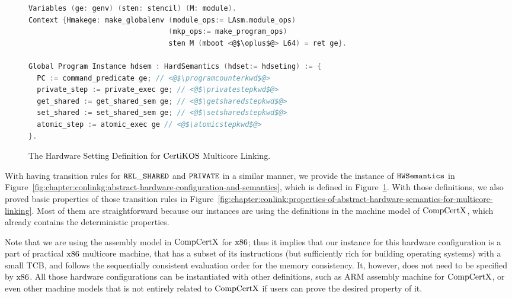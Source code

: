 \begin{figure}
\begin{lstlisting}[language=C]
Variables (ge: genv) (sten: stencil) (M: module).
Context {Hmakege: make_globalenv (module_ops:= LAsm.module_ops) 
                                 (mkp_ops:= make_program_ops) 
                                 sten M (mboot <@$\oplus$@> L64) = ret ge}.

Global Program Instance hdsem : HardSemantics (hdset:= hdseting) := {
  PC := command_predicate ge; // <@$\programcounterkwd$@>
  private_step := private_exec ge; // <@$\privatestepkwd$@>
  get_shared := get_shared_sem ge; // <@$\getsharedstepkwd$@>
  set_shared := set_shared_sem ge; // <@$\setsharedstepkwd$@>
  atomic_step := atomic_exec ge // <@$\atomicstepkwd$@>
}.
\end{lstlisting}
\caption{The Hardware Setting Definition for $\mathrm{CertiKOS}$ Multicore Linking.}
\label{fig:chapter:certikos:hardware-local-step-transition-rules}
\end{figure}

With having transition rules for ${{\mathrm{\texttt{REL}}}\_{\mathrm{\texttt{SHARED}}}}$ and ${{\mathrm{\texttt{PRIVATE}}}}$ in a similar manner, 
we provide the instance of ${\mathrm{\texttt{HWSemantics}}}$  in  Figure~\ref{fig:chapter:conlinkg:abstract-hardware-configuration-and-semantics}, which is defined in Figure~\ref{fig:chapter:certikos:hardware-local-step-transition-rules}. 
With those definitions, 
we also proved basic properties of those transition rules in Figure~\ref{fig:chapter:conlink:properties-of-abstract-hardware-semantics-for-multicore-linking}.
Most of them are straightforward because our instances are using the definitions in the machine model of $\mathrm{CompCertX}$,
which already contains the deterministic properties. 

Note that we are using the assembly model  in $\mathrm{CompCertX}$ for $\mathrm{x86}$; thus it implies that 
our instance for this hardware configuration is a  part of practical $\mathrm{x86}$ multicore machine,
that has a subset of its instructions (but sufficiently rich for building operating systems) with a small TCB, 
and follows the sequentially consistent evaluation order for the memory consistency. 
It, however, does not need to be specified by $\mathrm{x86}$. 
All those hardware configurations can be instantiated with other definitions, such as ARM assembly machine for $\mathrm{CompCertX}$, 
or even other machine models that is not entirely related to $\mathrm{CompCertX}$ if users can prove the desired property of it. 



